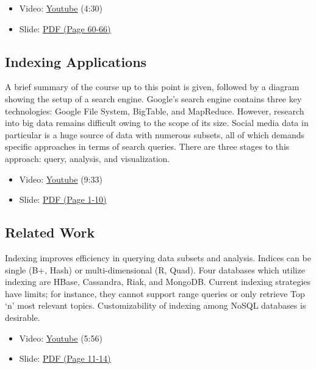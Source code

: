 \begin{itemize}

\item
  Video: \href{https://www.youtube.com/watch?v=KbFMpYRBTtU}{Youtube}
  (4:30)
\item
  Slide:
  \href{https://drive.google.com/open?id=0B88HKpainTSfaDFNbjNiMm44bnc}{PDF
  (Page 60-66)}
\end{itemize}

\subsection{Indexing Applications}\label{indexing-applications}

A brief summary of the course up to this point is given, followed by a
diagram showing the setup of a search engine. Google's search engine
contains three key technologies: Google File System, BigTable, and
MapReduce. However, research into big data remains difficult owing to
the scope of its size. Social media data in particular is a huge source
of data with numerous subsets, all of which demands specific approaches
in terms of search queries. There are three stages to this approach:
query, analysis, and visualization.

\begin{itemize}

\item
  Video: \href{https://www.youtube.com/watch?v=MxgabfoGH-M}{Youtube}
  (9:33)
\item
  Slide:
  \href{https://drive.google.com/open?id=0B88HKpainTSfWUh6dVNHcXloSnc}{PDF
  (Page 1-10)}
\end{itemize}

\subsection{Related Work}\label{related-work}

Indexing improves efficiency in querying data subsets and analysis.
Indices can be single (B+, Hash) or multi-dimensional (R, Quad). Four
databases which utilize indexing are HBase, Cassandra, Riak, and
MongoDB. Current indexing strategies have limits; for instance, they
cannot support range queries or only retrieve Top `n' most relevant
topics. Customizability of indexing among NoSQL databases is desirable.

\begin{itemize}

\item
  Video: \href{https://www.youtube.com/watch?v=NDjAdFSVzxo}{Youtube}
  (5:56)
\item
  Slide:
  \href{https://drive.google.com/open?id=0B88HKpainTSfWUh6dVNHcXloSnc}{PDF
  (Page 11-14)}
\end{itemize}

